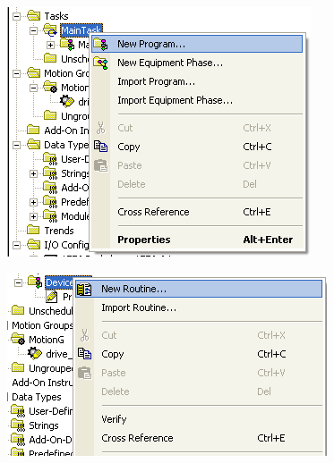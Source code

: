 \documentclass[a4paper,11pt]{scrartcl} %
\numberwithin{equation}{section} %
\numberwithin{figure}{section} %
\numberwithin{table}{section} %
\begin{document}
\begin{enumerate}
       \begin{minipage}[!ht]{\linewidth}
      \centering
      \begin{minipage}{0.45\linewidth}
          \begin{figure}[H]
              \includegraphics[width=\linewidth]{figures/software/step17}
          \end{figure}
      \end{minipage}
      \hspace{0.05\linewidth}
      \begin{minipage}{0.45\linewidth}
          \begin{figure}[H]
              \includegraphics[width=\linewidth]{figures/software/step18}
          \end{figure}
      \end{minipage}
  \end{minipage}
  

\end{enumerate}
\end{document}
